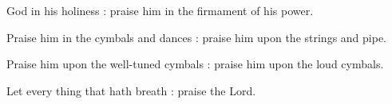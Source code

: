 
 God in his holiness : praise him in the firmament of his power.\par
{}
Praise him in the cymbals and dances : praise him upon the strings and pipe.\par
{}Praise him upon the well-tuned cymbals : praise him upon the loud cymbals.\par
{}Let every thing that hath breath : praise the Lord.